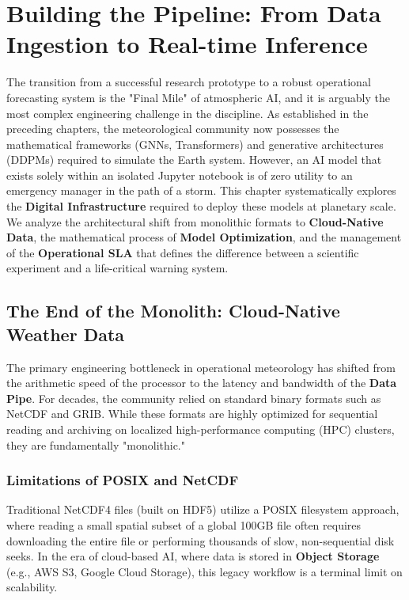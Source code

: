 \chapter{Building the Pipeline: From Data Ingestion to Real-time Inference}

The transition from a successful research prototype to a robust operational forecasting system is the "Final Mile" of atmospheric AI, and it is arguably the most complex engineering challenge in the discipline. As established in the preceding chapters, the meteorological community now possesses the mathematical frameworks (GNNs, Transformers) and generative architectures (DDPMs) required to simulate the Earth system. However, an AI model that exists solely within an isolated Jupyter notebook is of zero utility to an emergency manager in the path of a storm. This chapter systematically explores the \textbf{Digital Infrastructure} required to deploy these models at planetary scale. We analyze the architectural shift from monolithic formats to \textbf{Cloud-Native Data}, the mathematical process of \textbf{Model Optimization}, and the management of the \textbf{Operational SLA} that defines the difference between a scientific experiment and a life-critical warning system.

\section{The End of the Monolith: Cloud-Native Weather Data}

The primary engineering bottleneck in operational meteorology has shifted from the arithmetic speed of the processor to the latency and bandwidth of the \textbf{Data Pipe}. For decades, the community relied on standard binary formats such as NetCDF and GRIB. While these formats are highly optimized for sequential reading and archiving on localized high-performance computing (HPC) clusters, they are fundamentally "monolithic."

\subsection{Limitations of POSIX and NetCDF}
Traditional NetCDF4 files (built on HDF5) utilize a POSIX filesystem approach, where reading a small spatial subset of a global 100GB file often requires downloading the entire file or performing thousands of slow, non-sequential disk seeks. In the era of cloud-based AI, where data is stored in \textbf{Object Storage} (e.g., AWS S3, Google Cloud Storage), this legacy workflow is a terminal limit on scalability. 

